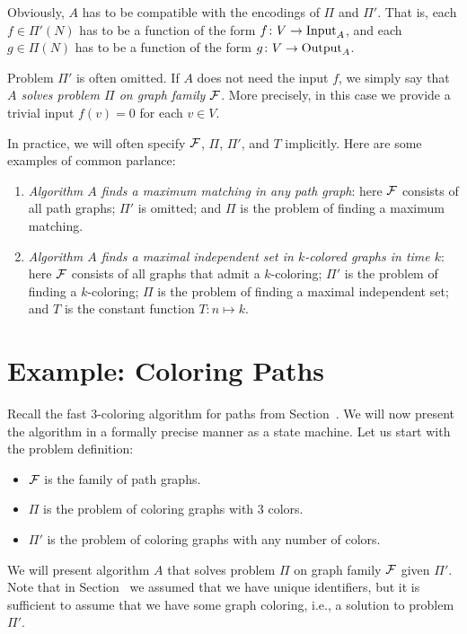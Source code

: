 Obviously, $A$ has to be compatible with the encodings of $\Pi$ and $\Pi'$. That is, each $f \in \Pi'(N)$ has to be a function of the form $f\colon V \to \operatorname{Input}_A$, and each $g \in \Pi(N)$ has to be a function of the form $g\colon V \to \operatorname{Output}_A$.

Problem $\Pi'$ is often omitted. If $A$ does not need the input $f$, we simply say that \emph{$A$ solves problem $\Pi$ on graph family $\mathcal{F}$}. More precisely, in this case we provide a trivial input $f(v) = 0$ for each $v \in V$.

In practice, we will often specify $\mathcal{F}$, $\Pi$, $\Pi'$, and $T$ implicitly. Here are some examples of common parlance:
\begin{enumerate}
    \item \emph{Algorithm $A$ finds a maximum matching in any path graph}: here $\mathcal{F}$ consists of all path graphs; $\Pi'$ is omitted; and $\Pi$ is the problem of finding a maximum matching.
    \item \emph{Algorithm $A$ finds a maximal independent set in $k$-colored graphs in time $k$}: here $\mathcal{F}$ consists of all graphs that admit a $k$-coloring; $\Pi'$ is the problem of finding a $k$-coloring; $\Pi$ is the problem of finding a maximal independent set; and $T$ is the constant function $T\colon n \mapsto k$.
\end{enumerate}


\section{Example: Coloring Paths}\label{sec:algo-p3c-formal}

Recall the fast $3$-coloring algorithm for paths from Section~. We will now present the algorithm in a formally precise manner as a state machine. Let us start with the problem definition:
\begin{itemize}[noitemsep]
    \item $\mathcal{F}$ is the family of path graphs.
    \item $\Pi$ is the problem of coloring graphs with $3$ colors.
    \item $\Pi'$ is the problem of coloring graphs with any number of colors.
\end{itemize}
We will present algorithm $A$ that solves problem $\Pi$ on graph family $\mathcal{F}$ given $\Pi'$. Note that in Section~ we assumed that we have unique identifiers, but it is sufficient to assume that we have some graph coloring, i.e., a solution to problem $\Pi'$.

